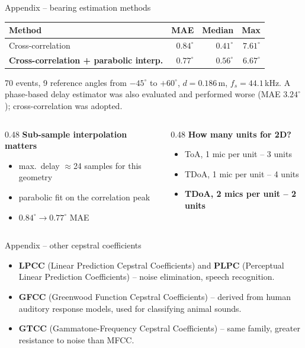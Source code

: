 \documentclass[aspectratio=169,10pt]{beamer}
\newcommand{\gtcc}[1]{\textbf{\color{accent}#1}}
\begin{document}
\begin{frame}{Appendix -- bearing estimation methods}
  \centering
  \footnotesize
  \begin{tabular}{lrrr}
    \toprule
    Method & MAE & Median & Max\\
    \midrule
    Cross-correlation                      & $0.84^\circ$ & $0.41^\circ$ & $7.61^\circ$\\
    \gtcc{Cross-correlation + parabolic interp.} & \gtcc{$0.77^\circ$} & \gtcc{$0.56^\circ$} & \gtcc{$6.67^\circ$}\\
    \bottomrule
  \end{tabular}
  \vspace{2mm}

  {\scriptsize 70 events, 9 reference angles from $-45^\circ$ to $+60^\circ$,
   $d = 0.186$\,m, $f_s = 44.1$\,kHz. A phase-based delay estimator was also evaluated
   and performed worse (MAE $3.24^\circ$); cross-correlation was adopted.}
  \vfill
  \begin{columns}[T,onlytextwidth]
    \begin{column}{0.48\textwidth}
      \small\textbf{Sub-sample interpolation matters}
      \begin{itemize}\small
        \item max.\ delay $\approx$24 samples for this geometry
        \item parabolic fit on the correlation peak
        \item $0.84^\circ \rightarrow 0.77^\circ$ MAE
      \end{itemize}
    \end{column}
    \begin{column}{0.48\textwidth}
      \small\textbf{How many units for 2D?}
      \begin{itemize}\small
        \item ToA, 1 mic per unit -- 3 units
        \item TDoA, 1 mic per unit -- 4 units
        \item \textbf{TDoA, 2 mics per unit -- 2 units}
      \end{itemize}
    \end{column}
  \end{columns}
\end{frame}

\begin{frame}{Appendix -- other cepstral coefficients}
  \begin{itemize}
    \item \textbf{LPCC} (Linear Prediction Cepstral Coefficients) and \textbf{PLPC}
          (Perceptual Linear Prediction Coefficients) -- noise elimination, speech
          recognition.
    \item \textbf{GFCC} (Greenwood Function Cepstral Coefficients) -- derived from
          human auditory response models, used for classifying animal sounds.
    \item \textbf{GTCC} (Gammatone-Frequency Cepstral Coefficients) -- same family,
          greater resistance to noise than MFCC.
  \end{itemize}
\end{frame}
\end{document}
